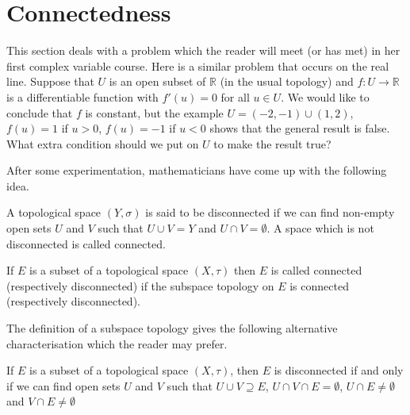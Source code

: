


























\section{Connectedness} This section deals with a problem
which the reader will meet (or has met) in her first
complex variable course. Here is a similar problem that
occurs on the real line. Suppose that $U$ is an open
subset of ${\mathbb R}$ (in the usual topology)
and $f:U\rightarrow {\mathbb R}$ is a differentiable function
with $f'(u)=0$ for all $u\in U$. We would like to
conclude that $f$ is constant, but the example
$U=(-2,-1)\cup (1,2)$, $f(u)=1$ if $u>0$,
$f(u)=-1$ if $u<0$ shows that the general result
is false. What extra condition should we put on $U$
to make the result true?

After some experimentation, mathematicians have come up
with the following idea.
\begin{definition}\label{D;disconnected} 
A topological space $(Y,\sigma)$ is
said to be disconnected if we can find non-empty
open sets $U$ and $V$ such that $U\cup V=Y$
and $U\cap V=\emptyset$. A space which is not
disconnected is called connected.
\end{definition}
\begin{definition} If $E$ is a subset of a topological
space $(X,\tau)$ then $E$ is called connected (respectively
disconnected) if the subspace topology on $E$ is
connected (respectively
disconnected).

\end{definition}
The definition of a subspace topology gives the following
alternative characterisation which the reader may prefer.
\begin{lemma} If $E$ is a subset of a topological
space $(X,\tau)$, then $E$ is disconnected if 
and only if we can find  
open sets $U$ and $V$ such that $U\cup V\supseteq E$,
$U\cap V\cap E=\emptyset$, $U\cap E\neq\emptyset$
and $V\cap E\neq\emptyset$
\end{lemma}

